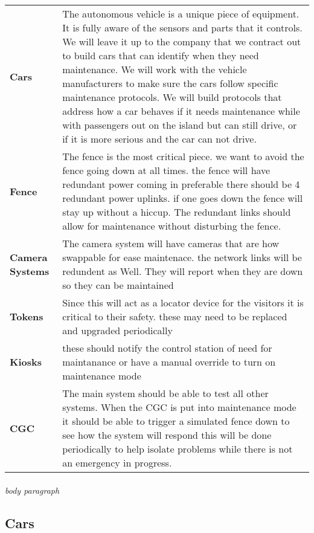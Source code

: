 \documentclass[12pt]{article}
\begin{document}
	\begin{table}[H]
		\begin{tabular}{lp{10cm}}
		\textbf{Cars} & The autonomous vehicle is a unique piece of equipment. It is fully 
		aware of the sensors and parts that it controls. We will leave it up to the 
		company that we contract out to build cars that can identify when they need 
		maintenance. We will work with the vehicle manufacturers to make sure the cars 
		follow specific maintenance protocols. We will build protocols that address how 
		a car behaves if it needs maintenance while with passengers out on the island but 
		can still drive, or if it is more serious and the car can not drive.\\
		\textbf{Fence} & The fence is the most critical piece. we want to avoid the fence going down at all times.
    	the fence will have redundant power coming in preferable there should be 4 redundant power uplinks. 
    	if one goes down the fence will stay up without a hiccup. The redundant links should allow for 
    	maintenance without disturbing the fence.\\
		\textbf{Camera Systems} & The camera system will have cameras that are how swappable for ease maintenace. the network links will be redundent as Well.
     	They will report when they are down so they can be maintained\\
		\textbf{Tokens} & Since this will act as a locator device for the visitors 
		it is critical to their safety. these may need to be replaced and upgraded periodically\\
		\textbf{Kiosks} & these should notify the control station of need for maintanance or have a manual override to turn on maintenance mode\\
		\textbf{CGC} & The main system should be able to test all other systems. When the CGC is 
		put into maintenance mode it should be able to trigger a simulated fence down to see how 
		the system will respond this will be done periodically to help isolate problems while 
		there is not an emergency in progress.\\		
		\end{tabular}
	\end{table}
	\paragraph{} \textit{body paragraph}

	\subsection{Cars}
\end{document}
